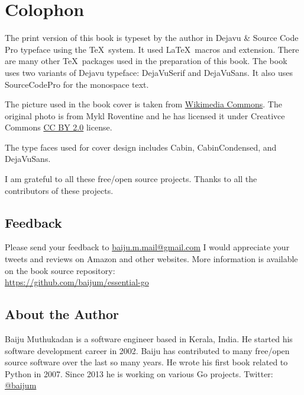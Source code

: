 \cleardoublepage
{}
\chapter*{Colophon}

The print version of this book is typeset by the author in Dejavu \&
Source Code Pro typeface using the
\TeX\ system.  It used \LaTeX\ macros and {} extension.
There are many other \TeX\ packages used in the preparation of this
book.  The book uses two variants of Dejavu typeface: DejaVuSerif and
DejaVuSans. It also uses SourceCodePro for the monospace text.

The picture used in the book cover is taken from
\href{https://commons.wikimedia.org/wiki/File:The_ladder_of_life_is_full_of_splinters.jpg}{Wikimedia Commons}.
The original photo is from Mykl Roventine and he has licensed it under
Creativce
Commons \href{https://creativecommons.org/licenses/by/2.0}{CC BY 2.0}
license.

The type faces used for cover design includes Cabin, CabinCondensed,
and DejaVuSans.


I am grateful to all these free/open source projects.  Thanks to all
the contributors of these projects.

\section*{Feedback}

Please send your feedback
to \href{mailto:baiju.m.mail@gmail.com}{baiju.m.mail@gmail.com} I would
appreciate your tweets and reviews on Amazon and other websites.  More
information is available on the book
source repository:\\ \url{https://github.com/baijum/essential-go}

\pagebreak
\thispagestyle{empty} %

\section*{About the Author}

Baiju Muthukadan is a software engineer based in Kerala, India. He started his
software development career in 2002. Baiju has contributed to many free/open
source software over the last so many years. He wrote his first book related to
Python in 2007. Since 2013 he is working on various Go projects. Twitter:
\href{https://twitter.com/baijum}{@baijum}

